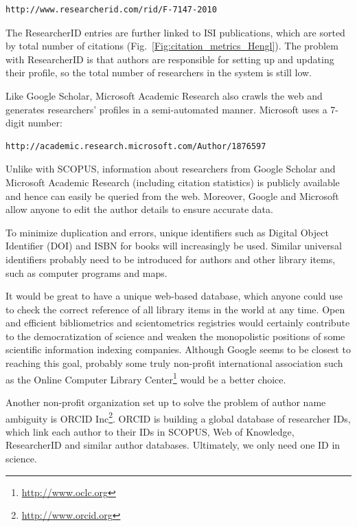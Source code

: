 \documentclass[graybox,envcountchap,sectrefs,UStrade]{svmono}
\begin{document}
\begin{verbatim}
http://www.researcherid.com/rid/F-7147-2010
\end{verbatim}

The ResearcherID entries are further linked to ISI publications, which are sorted by total number of citations (Fig.\@~\ref{Fig:citation_metrics_Hengl}). The problem with ResearcherID is that authors are responsible for setting up and updating their profile, so the total number of researchers in the system is still low.\par

Like Google Scholar, Microsoft Academic Research also crawls the web and generates researchers' profiles in a semi-automated manner. Microsoft uses a 7-digit number:

\begin{verbatim}
http://academic.research.microsoft.com/Author/1876597
\end{verbatim}

Unlike with SCOPUS, information about researchers from Google Scholar and Microsoft Academic Research (including citation statistics) is publicly available and hence can easily be queried from the web. Moreover, Google and Microsoft allow anyone to edit the author details to ensure accurate data. \par

To minimize duplication and errors, unique identifiers such as Digital Object Identifier (DOI) and ISBN for books will increasingly be used. Similar universal identifiers probably need to be introduced for authors and other library items, such as computer programs and maps. \par

It would be great to have a unique web-based database, which anyone could use to check the correct reference of all library items in the world at any time. Open and efficient bibliometrics and scientometrics registries would certainly contribute to the democratization of science and weaken the monopolistic positions of some scientific information indexing companies. Although Google seems to be closest to reaching this goal, probably some truly non-profit international association such as the Online Computer Library Center\footnote{\url{http://www.oclc.org}} would be a better choice.\par

Another non-profit organization set up to solve the problem of author name ambiguity is ORCID Inc\footnote{\url{http://www.orcid.org}}. ORCID is building a global database of researcher IDs, which link each author to their IDs in SCOPUS, Web of Knowledge, ResearcherID and similar author databases. Ultimately, we only need one ID in science.\par
\end{document}
